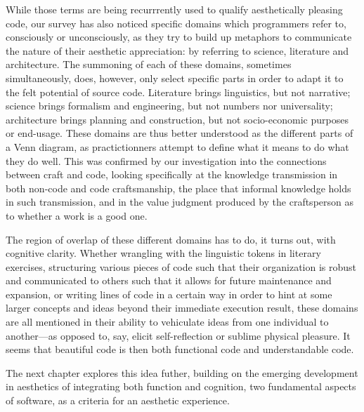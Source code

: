 While those terms are being recurrrently used to qualify aesthetically pleasing code, our survey has also noticed specific domains which programmers refer to, consciously or unconsciously, as they try to build up metaphors to communicate the nature of their aesthetic appreciation: by referring to science, literature and architecture. The summoning of each of these domains, sometimes simultaneously, does, however, only select specific parts in order to adapt it to the felt potential of source code. Literature brings linguistics, but not narrative; science brings formalism and engineering, but not numbers nor universality; architecture brings planning and construction, but not socio-economic purposes or end-usage. These domains are thus better understood as the different parts of a Venn diagram, as practictionners attempt to define what it means to do what they do well. This was confirmed by our investigation into the connections between craft and code, looking specifically at the knowledge transmission in both non-code and code craftsmanship, the place that informal knowledge holds in such transmission, and in the value judgment produced by the craftsperson as to whether a work is a good one.

The region of overlap of these different domains has to do, it turns out, with cognitive clarity. Whether wrangling with the linguistic tokens in literary exercises, structuring various pieces of code such that their organization is robust and communicated to others such that it allows for future maintenance and expansion, or writing lines of code in a certain way in order to hint at some larger concepts and ideas beyond their immediate execution result, these domains are all mentioned in their ability to vehiculate ideas from one individual to another—as opposed to, say, elicit self-reflection or sublime physical pleasure. It seems that beautiful code is then both functional code and understandable code.

The next chapter explores this idea futher, building on the emerging development in aesthetics of integrating both function and cognition, two fundamental aspects of software, as a criteria for an aesthetic experience.

